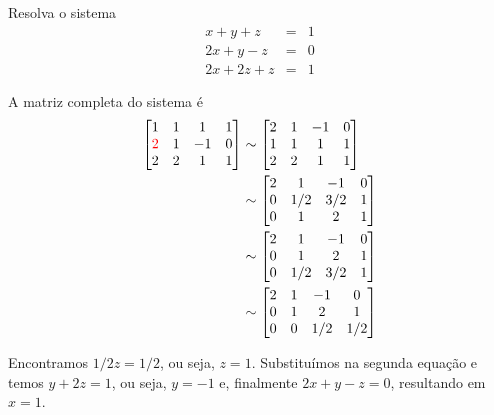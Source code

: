 \begin{ex} Resolva o sistema
\begin{eqnarray*}
  x+y+z  &=& 1\\
  2x+y-z &=& 0\\
  2x+2z+z &=& 1
\end{eqnarray*}
\end{ex}

\begin{sol}
A matriz completa do sistema é
\begin{equation*}
  \begin{split}
    \begin{bmatrix}
      1 &1&  1&1\\
      {\color{red}{2}} &1& -1&0\\
      2 & 2 &1&1
    \end{bmatrix}
    &\sim
    \begin{bmatrix}
      2 &1& -1&0\\
      1 &1&  1&1\\
      2 &2&  1&1
    \end{bmatrix}\\ 
    &\sim
    \begin{bmatrix}
      2 &1& -1&0\\
      0 &1/2& 3/2&1\\
      0 & 1 &2&1
    \end{bmatrix}\\
    &\sim
    \begin{bmatrix}
      2 &1& -1&0\\
      0 & 1 &2&1\\
      0 &1/2& 3/2&1
    \end{bmatrix}\\
    &\sim
    \begin{bmatrix}
      2 &1& -1&0\\
      0 & 1 &2&1\\
      0 &0& 1/2&1/2
    \end{bmatrix}    
  \end{split}
\end{equation*}

Encontramos $1/2z=1/2$, ou seja, $z=1$. Substituímos na segunda equação e temos $y+2z=1$, ou seja, $y=-1$ e, finalmente $2x+y-z=0$, resultando em $x=1$.
\end{sol}

